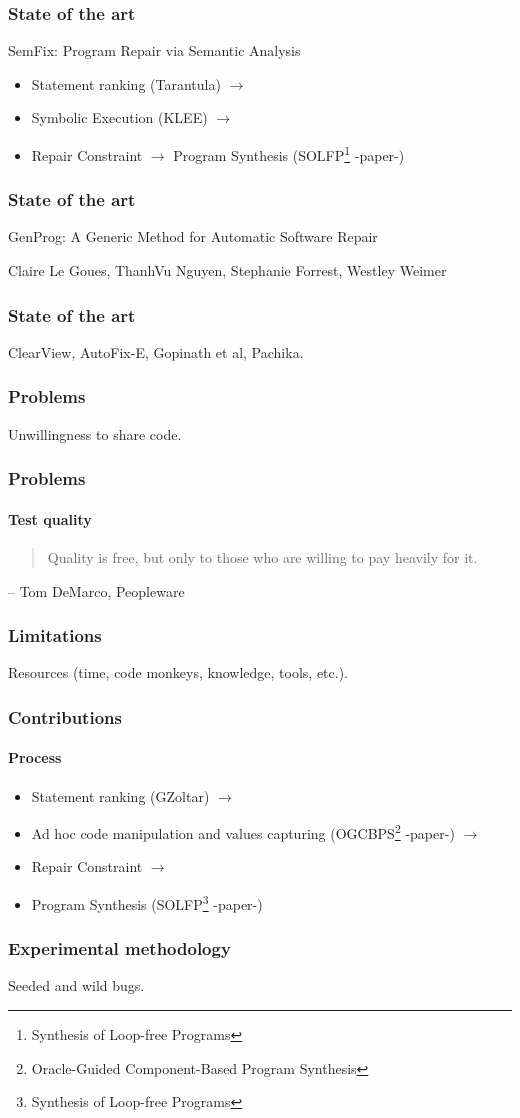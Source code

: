 \documentclass{beamer}
\begin{document}
  \frame
  {
    \frametitle{State of the art}
    SemFix: Program Repair via Semantic Analysis
\begin{itemize}
\item Statement ranking (Tarantula) $\rightarrow$
\item Symbolic Execution (KLEE) $\rightarrow$
\item Repair Constraint $\rightarrow$  Program Synthesis (SOLFP\footnote{Synthesis of Loop-free Programs} -paper-)
\end{itemize}
 }


  \frame
  {
    \frametitle{State of the art}
    GenProg: A Generic Method for Automatic Software Repair
    
Claire Le Goues, ThanhVu Nguyen, Stephanie Forrest, Westley Weimer
  }

  \frame
  {
    \frametitle{State of the art}
    ClearView, AutoFix-E, Gopinath et al, Pachika.
  }

  \frame
  {
    \frametitle{Problems}
    Unwillingness to share code.
  }

  \frame
  {
    \frametitle{Problems}
    \framesubtitle{Test quality}
   \begin{quote}
    Quality is free, but only to those who are willing to pay heavily for it.
   \end{quote}
   – Tom DeMarco, Peopleware
   
   
%    
%    
%    
%    
   
  }
 
  \frame
  {
    \frametitle{Limitations}
    Resources (time, code monkeys, knowledge, tools, etc.).
  }

  \frame
  {  
    \frametitle{Contributions}
      \framesubtitle{Process}
\begin{itemize}
\item Statement ranking (GZoltar)  $\rightarrow$
\item Ad hoc code manipulation and values capturing (OGCBPS\footnote{Oracle-Guided Component-Based Program Synthesis} -paper-) $\rightarrow$
\item Repair Constraint  $\rightarrow$
\item Program Synthesis (SOLFP\footnote{Synthesis of Loop-free Programs} -paper-)
\end{itemize}
}


  \frame
  {
    \frametitle{Experimental methodology}
    Seeded and wild bugs.
  }
  
\end{document}
